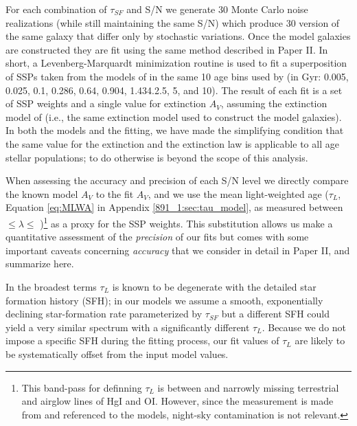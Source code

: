 
For each combination of $\tau_{SF}$ and S/N we generate 30 Monte Carlo
noise realizations (while still maintaining the same S/N) which
produce 30 version of the same galaxy that differ only by stochastic
variations. Once the model galaxies are constructed they are fit using
the same method described in Paper II. In short, a Levenberg-Marquardt
minimization routine is used to fit a superposition of SSPs taken from
the models of \citet{Bruzual03} in the same 10 age bins used by
\citet{Tremonti04} (in Gyr: 0.005, 0.025, 0.1, 0.286, 0.64, 0.904,
1.434.2.5, 5, and 10). The result of each fit is a set of SSP weights
and a single value for extinction $A_V$, assuming the extinction model
of \citet{Charlot00} (i.e., the same extinction model used to
construct the model galaxies). In both the models and the fitting, we
have made the simplifying condition that the same value for the
extinction and the extinction law is applicable to all age stellar
populations; to do otherwise is beyond the scope of this analysis.

When assessing the accuracy and precision of each S/N level we
directly compare the known model $A_V$ to the fit $A_V$, and we use
the mean light-weighted age ($\tau_L$, Equation \ref{eq:MLWA} in
Appendix \ref{891_1:sec:tau_model}, as measured between 
$\leq\lambda\leq$ )\footnote{ This band-pass for
  definning $\tau_L$ is between and narrowly missing terrestrial and
  airglow lines of HgI and OI. However, since the measurement is made
  from and referenced to the models, night-sky contamination is not
  relevant.}  as a proxy for the SSP weights. This substitution allows
us make a quantitative assessment of the {\it precision} of our fits
but comes with some important caveats concerning {\it accuracy} that
we consider in detail in Paper II, and summarize here.

In the broadest terms $\tau_L$ is known to be degenerate with the
detailed star formation history (SFH); in our models we assume a
smooth, exponentially declining star-formation rate parameterized by
$\tau_{SF}$ but a different SFH could yield a very similar spectrum
with a significantly different $\tau_L$.  Because we do not impose a
specific SFH during the fitting process, our fit values of $\tau_L$
are likely to be systematically offset from the input model values.

